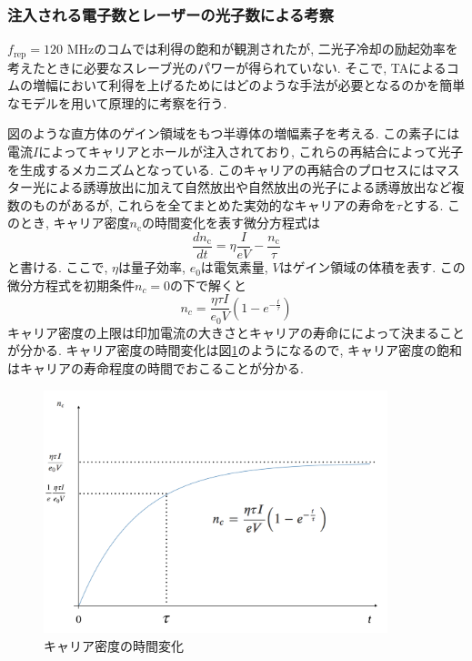 \documentclass[uplatex, dvipdfmx, a4paper, report, papersize, 11pt]{jsbook}
\begin{document}
\subsubsection{注入される電子数とレーザーの光子数による考察}
$f_{\mathrm{rep}} = 120$ MHzのコムでは利得の飽和が観測されたが, 二光子冷却の励起効率を考えたときに必要なスレーブ光のパワーが得られていない. そこで, TAによるコムの増幅において利得を上げるためにはどのような手法が必要となるのかを簡単なモデルを用いて原理的に考察を行う. \par
図のような直方体のゲイン領域をもつ半導体の増幅素子を考える. この素子には電流$I$によってキャリアとホールが注入されており, これらの再結合によって光子を生成するメカニズムとなっている. このキャリアの再結合のプロセスにはマスター光による誘導放出に加えて自然放出や自然放出の光子による誘導放出など複数のものがあるが, これらを全てまとめた実効的なキャリアの寿命を$\tau$とする. このとき, キャリア密度$n_{\mathrm{c}}$の時間変化を表す微分方程式は
\begin{equation}
  \frac{dn_{\mathrm{c}}}{dt} = \eta \frac{I}{eV}-\frac{n_{\mathrm{c}}}{\tau}
\end{equation}
と書ける. ここで, $\eta$は量子効率, $e_0$は電気素量, $V$はゲイン領域の体積を表す. この微分方程式を初期条件$n_c = 0$の下で解くと
\begin{equation}
  n_c = \frac{\eta\tau I}{e_0V}\left(1-e^{-\frac{t}{\tau}}\right)
\end{equation}
キャリア密度の上限は印加電流の大きさとキャリアの寿命にによって決まることが分かる. キャリア密度の時間変化は図\ref{carrier_saturation}のようになるので, キャリア密度の飽和はキャリアの寿命程度の時間でおこることが分かる. \\
\begin{figure}[H]
 \begin{center}
  \includegraphics[width=100mm]{figures/chapter4/carrier_saturation.png}
\end{center}
 \caption{キャリア密度の時間変化}
 \label{carrier_saturation}
\end{figure}
\end{document}
